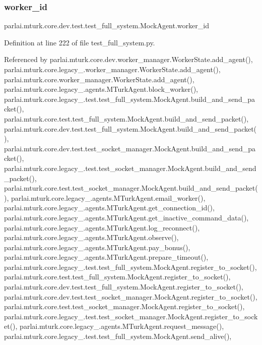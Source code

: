 \subsubsection{\texorpdfstring{worker\+\_\+id}{worker\_id}}
{\footnotesize\ttfamily parlai.\+mturk.\+core.\+dev.\+test.\+test\+\_\+full\+\_\+system.\+Mock\+Agent.\+worker\+\_\+id}



Definition at line 222 of file test\+\_\+full\+\_\+system.\+py.



Referenced by parlai.\+mturk.\+core.\+dev.\+worker\+\_\+manager.\+Worker\+State.\+add\+\_\+agent(), parlai.\+mturk.\+core.\+legacy\+\_.\+worker\+\_\+manager.\+Worker\+State.\+add\+\_\+agent(), parlai.\+mturk.\+core.\+worker\+\_\+manager.\+Worker\+State.\+add\+\_\+agent(), parlai.\+mturk.\+core.\+legacy\+\_.\+agents.\+M\+Turk\+Agent.\+block\+\_\+worker(), parlai.\+mturk.\+core.\+legacy\+\_.\+test.\+test\+\_\+full\+\_\+system.\+Mock\+Agent.\+build\+\_\+and\+\_\+send\+\_\+packet(), parlai.\+mturk.\+core.\+test.\+test\+\_\+full\+\_\+system.\+Mock\+Agent.\+build\+\_\+and\+\_\+send\+\_\+packet(), parlai.\+mturk.\+core.\+dev.\+test.\+test\+\_\+full\+\_\+system.\+Mock\+Agent.\+build\+\_\+and\+\_\+send\+\_\+packet(), parlai.\+mturk.\+core.\+dev.\+test.\+test\+\_\+socket\+\_\+manager.\+Mock\+Agent.\+build\+\_\+and\+\_\+send\+\_\+packet(), parlai.\+mturk.\+core.\+legacy\+\_.\+test.\+test\+\_\+socket\+\_\+manager.\+Mock\+Agent.\+build\+\_\+and\+\_\+send\+\_\+packet(), parlai.\+mturk.\+core.\+test.\+test\+\_\+socket\+\_\+manager.\+Mock\+Agent.\+build\+\_\+and\+\_\+send\+\_\+packet(), parlai.\+mturk.\+core.\+legacy\+\_.\+agents.\+M\+Turk\+Agent.\+email\+\_\+worker(), parlai.\+mturk.\+core.\+legacy\+\_.\+agents.\+M\+Turk\+Agent.\+get\+\_\+connection\+\_\+id(), parlai.\+mturk.\+core.\+legacy\+\_.\+agents.\+M\+Turk\+Agent.\+get\+\_\+inactive\+\_\+command\+\_\+data(), parlai.\+mturk.\+core.\+legacy\+\_.\+agents.\+M\+Turk\+Agent.\+log\+\_\+reconnect(), parlai.\+mturk.\+core.\+legacy\+\_.\+agents.\+M\+Turk\+Agent.\+observe(), parlai.\+mturk.\+core.\+legacy\+\_.\+agents.\+M\+Turk\+Agent.\+pay\+\_\+bonus(), parlai.\+mturk.\+core.\+legacy\+\_.\+agents.\+M\+Turk\+Agent.\+prepare\+\_\+timeout(), parlai.\+mturk.\+core.\+legacy\+\_.\+test.\+test\+\_\+full\+\_\+system.\+Mock\+Agent.\+register\+\_\+to\+\_\+socket(), parlai.\+mturk.\+core.\+test.\+test\+\_\+full\+\_\+system.\+Mock\+Agent.\+register\+\_\+to\+\_\+socket(), parlai.\+mturk.\+core.\+dev.\+test.\+test\+\_\+full\+\_\+system.\+Mock\+Agent.\+register\+\_\+to\+\_\+socket(), parlai.\+mturk.\+core.\+dev.\+test.\+test\+\_\+socket\+\_\+manager.\+Mock\+Agent.\+register\+\_\+to\+\_\+socket(), parlai.\+mturk.\+core.\+test.\+test\+\_\+socket\+\_\+manager.\+Mock\+Agent.\+register\+\_\+to\+\_\+socket(), parlai.\+mturk.\+core.\+legacy\+\_.\+test.\+test\+\_\+socket\+\_\+manager.\+Mock\+Agent.\+register\+\_\+to\+\_\+socket(), parlai.\+mturk.\+core.\+legacy\+\_.\+agents.\+M\+Turk\+Agent.\+request\+\_\+message(), parlai.\+mturk.\+core.\+legacy\+\_.\+test.\+test\+\_\+full\+\_\+system.\+Mock\+Agent.\+send\+\_\+alive(), 